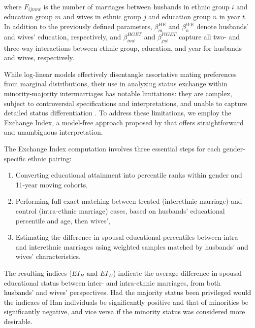 \noindent where $F_{ijmnt}$ is the number of marriages between husbands in
ethnic group $i$ and education group $m$ and wives in ethnic group $j$ and
education group $n$ in year $t$.
In addition to the previously defined parameters,
$\beta_m^{HE}$ and $\beta_n^{WE}$ denote husbands' and wives' education,
respectively,
and $\beta_{imt}^{HGET}$ and $\beta_{jnt}^{WGET}$ capture all two- and
three-way interactions between ethnic group, education, and year for husbands
and wives, respectively.

While log-linear models effectively disentangle assortative mating preferences
from marginal distributions, their use in analyzing status exchange within
minority-majority intermarriages has notable limitations:
they are complex, subject to controversial specifications and interpretations,
and unable to capture detailed status differentiation \cite{xie_new_2021}.
To address these limitations, we employ the Exchange Index,
a model-free approach proposed by \citeauthor{xie_new_2021}
\citeyear{xie_new_2021} that offers straightforward and unambiguous
interpretation.

The Exchange Index computation involves three essential steps for each
gender-specific ethnic pairing:

\begin{enumerate}
    \item Converting educational attainment into percentile ranks within gender
          and 11-year moving cohorts,
    \item Performing full exact matching between treated (interethnic marriage)
          and control (intra-ethnic marriage) cases, based on husbands'
          educational percentile and age, then wives',
    \item Estimating the difference in spousal educational percentiles between
          intra- and interethnic marriages using weighted samples matched by
          husbands' and wives' characteristics.
\end{enumerate}

The resulting indices ($EI_{H}$ and $EI_{W}$) indicate the average difference in
spousal educational status between inter- and intra-ethnic marriages, from both
husbands' and wives' perspectives.
Had the majority status been privileged would the indicaes of Han individuals be
significantly positive and that of minorities be significantly negative, and
vice versa if the minority status was considered more desirable.